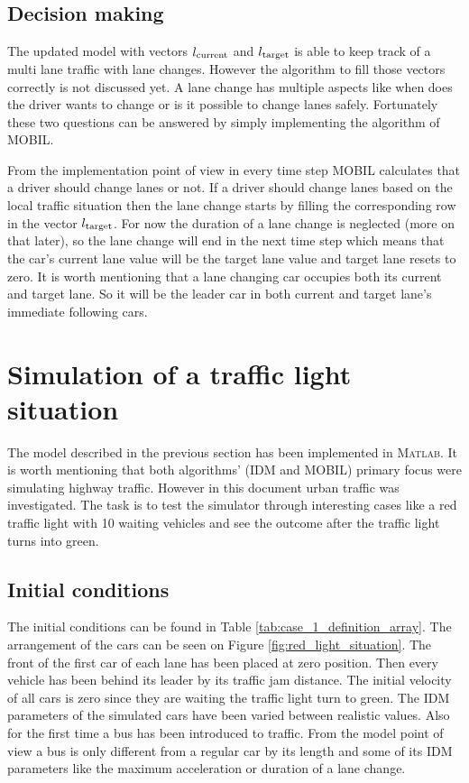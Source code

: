 		\subsection*{Decision making}
		The updated model with vectors $l_{\rm current}$ and $l_{\rm target}$ is able to keep track of a multi lane traffic with lane changes. However the algorithm to fill those vectors correctly is not discussed yet. A lane change has multiple aspects like when does the driver wants to change or is it possible to change lanes safely. Fortunately these two questions can be answered by simply implementing the algorithm of MOBIL.

		From the implementation point of view in every time step MOBIL calculates that a driver should change lanes or not. If a driver should change lanes based on the local traffic situation then the lane change starts by filling the corresponding row in the vector $l_{\rm target}$. For now the duration of a lane change is neglected (more on that later), so the lane change will end in the next time step which means that the car's current lane value will be the target lane value and target lane resets to zero. It is worth mentioning that a lane changing car occupies both its current and target lane. So it will be the leader car in both current and target lane's immediate following cars.
	\section{Simulation of a traffic light situation}
		The model described in the previous section has been implemented in \textsc{Matlab}. It is worth mentioning that both algorithms' (IDM and MOBIL) primary focus were simulating highway traffic. However in this document urban traffic was investigated. The task is to test the simulator through interesting cases like a red traffic light with 10 waiting vehicles and see the outcome after the traffic light turns into green.
		
		\subsection*{Initial conditions}
		The initial conditions can be found in Table \ref{tab:case_1_definition_array}. The arrangement of the cars can be seen on Figure \ref{fig:red_light_situation}. The front of the first car of each lane has been placed at zero position. Then every vehicle has been behind its leader by its traffic jam distance. The initial velocity of all cars is zero since they are waiting the traffic light turn to green.  The IDM parameters of the simulated cars have been varied between realistic values. Also for the first time a bus has been introduced to traffic. From the model point of view a bus is only different from a regular car by its length and some of its IDM parameters like the maximum acceleration or duration of a lane change.
		
